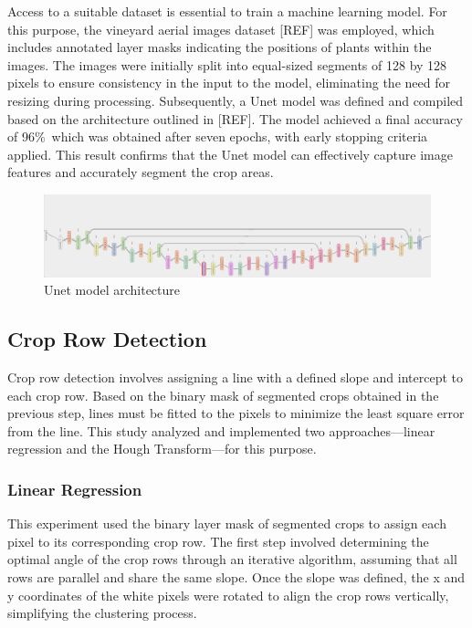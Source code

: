 \documentclass[conference]{IEEEtran}
\begin{document}
Access to a suitable dataset is essential to train a machine learning model. For this purpose, the vineyard aerial images dataset [REF] was employed, which includes annotated layer masks indicating the positions of plants within the images. The images were initially split into equal-sized segments of 128 by 128 pixels to ensure consistency in the input to the model, eliminating the need for resizing during processing. Subsequently, a Unet model was defined and compiled based on the architecture outlined in [REF]. The model achieved a final accuracy of 96\%\, which was obtained after seven epochs, with early stopping criteria applied. This result confirms that the Unet model can effectively capture image features and accurately segment the crop areas.

\begin{figure}[htbp]
\includegraphics[width=\linewidth]{UNET.png}
\caption{Unet model architecture}
\label{fig3}
\end{figure}

\subsection{Crop Row Detection}
Crop row detection involves assigning a line with a defined slope and intercept to each crop row. Based on the binary mask of segmented crops obtained in the previous step, lines must be fitted to the pixels to minimize the least square error from the line. This study analyzed and implemented two approaches—linear regression and the Hough Transform—for this purpose.

\subsubsection{Linear Regression}
This experiment used the binary layer mask of segmented crops to assign each pixel to its corresponding crop row. The first step involved determining the optimal angle of the crop rows through an iterative algorithm, assuming that all rows are parallel and share the same slope. Once the slope was defined, the x and y coordinates of the white pixels were rotated to align the crop rows vertically, simplifying the clustering process.
\end{document}
